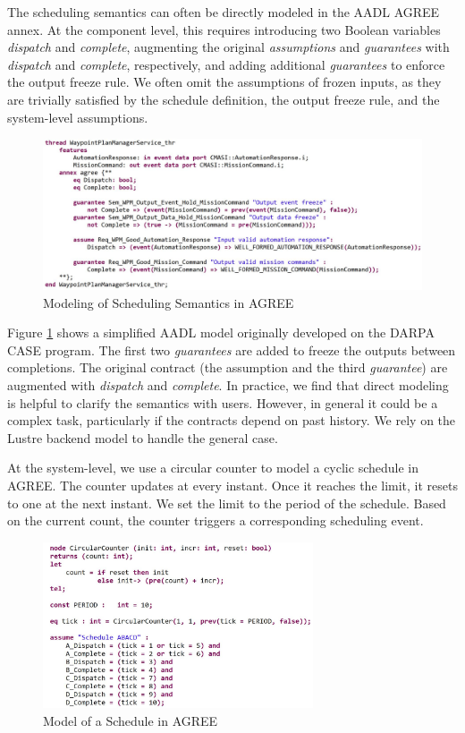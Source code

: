 The scheduling semantics can often be directly modeled in the AADL AGREE annex. At the component level, this requires introducing two Boolean variables \emph{dispatch} and \emph{complete}, augmenting the original \emph{assumptions} and \emph{guarantees} with \emph{dispatch} and \emph{complete}, respectively, and adding additional \emph{guarantees} to enforce the output freeze rule. We often omit the assumptions of frozen inputs, as they are trivially satisfied by the schedule definition, the output freeze rule, and the system-level assumptions.

\begin{figure}[ht!]
\centering
\includegraphics[width=130mm]{wpmAGREE3.jpg}
\caption{Modeling of Scheduling Semantics in AGREE\label{wpmAGREE}}
\end{figure}

Figure \ref{wpmAGREE} shows a simplified AADL model originally developed on the DARPA CASE program. The first two \emph{guarantees} are added to freeze the outputs between completions. The original contract (the assumption and the third \emph{guarantee}) are augmented with \emph{dispatch} and \emph{complete}.
In practice, we find that direct modeling is helpful to clarify the semantics with users. However, in general it could be a complex task, particularly if the contracts depend on past history. We rely on the Lustre backend model to handle the general case.

At the system-level, we use a circular counter to model a cyclic schedule in AGREE. 
The counter updates at every instant. Once it reaches the limit, it resets to one at the next instant.
We set the limit to the period of the schedule. 
Based on the current count, the counter triggers a corresponding scheduling event.

\begin{figure}[ht!]
\centering
\includegraphics[width=80mm]{schedule.jpg}
\caption{Model of a Schedule in AGREE\label{schedule}}
\end{figure}

